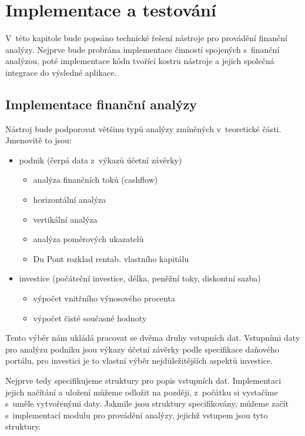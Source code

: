 \chapter{Implementace a testování}

V~této kapitole bude popsáno technické řešení nástroje pro provádění finanční analýzy. Nejprve bude probrána implementace činností spojených s~finanční analýzou, poté implementace kódu tvořící kostru nástroje a jejich společná integrace do výsledné aplikace.

\section{Implementace finanční analýzy}
Nástroj bude podporovat většinu typů analýzy zmíněných v~teoretické části. Jmenovitě to jsou: 

\begin{itemize}
  \item podnik (čerpá data z~výkazů účetní závěrky)
  \begin{itemize}
    \item analýza finančních toků (cashflow)
    \item horizontální analýza
    \item vertikální analýza
    \item analýza poměrových ukazatelů
    \item Du Pont rozklad rentab. vlastního kapitálu 
  \end{itemize}
  \item investice (počáteční investice, délka, peněžní toky, diskontní sazba)
  \begin{itemize}
    \item výpočet vnitřního výnosového procenta
    \item výpočet čisté současné hodnoty
  \end{itemize}
\end{itemize}

Tento výběr nám ukládá pracovat se dvěma druhy vstupních dat. Vstupními daty pro analýzu podniku jsou výkazy účetní závěrky podle specifikace daňového portálu, pro investici je to vlastní výběr nejdůležitějších aspektů investice. 

Nejprve tedy specifikujeme struktury pro popis vstupních dat. Implementaci jejich načítání a uložení můžeme odložit na později, z~počátku si vystačíme s~uměle vytvořenými daty. Jakmile jsou struktury specifikovány, můžeme začít s~implementací modulu pro provádění analýzy, jejichž vstupem jsou tyto struktury.

